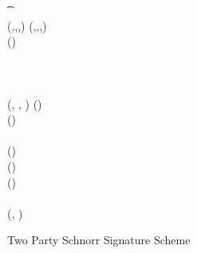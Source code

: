 \begin{figure}
\begin{center}
{\begin{varwidth}{\textwidth}
{            \t \pcreturn \cnstFalsum \< \< \\
            \pcreturn (\varSecKeyAlice,\varPubKeyAlice,\varNonceAlice,\varSigContext) \< \< \pcreturn (\varSecKeyBob,\varPubKeyBob,\varNonceBob,\varSigContext)
            } \\
            \procedure[linenumbering]{$\procSignPrt{\varMsg}{\varSecKeyAlice}{\varNonceAlice}{\varSigContext}$} {
            (\varRand \opSeperate \varPubKey) \opFunResult \varSigContext \\
            \varRandAlice \opAssign \funGen{\varNonceAlice} \\
            \varSchnorrChallenge \opAssign \funHash{\varMsg \opConc \varRand \opConc \varPubKey} \\
            \varSAlice \opAssign \varNonceAlice \opAddScalar \varSecKeyAlice \opTimesScalar \varSchnorrChallenge \\
            \pcreturn \varSigAlice \opAssign (\varSAlice, \varRandAlice, \varSigContext)
            }
            \procedure[linenumbering]{$\procVerfPtSig{\varSigAlice}{\varMsg}{\varPubKeyAlice}$} {
            (\varSAlice \opSeperate \varRandAlice \opSeperate \varSigContext) \opFunResult \varSigAlice \\
            (\varPubKey \opSeperate \varRand) \opFunResult \varSigContext \\
            \varSchnorrChallenge \opAssign \funHash{\varMsg \opConc \varRand \opConc \varPubKey} \\
            \pcreturn \funGen{\varSAlice} \opEq \varRandAlice \opAddPoint \opPointScalar{\varPubKeyAlice}{\varSchnorrChallenge}
            }
            \procedure[linenumbering]{$\procFinSig{\varSigAlice}{\varSigBob}$} {
            (\varSAlice \opSeperate \varRandAlice \opSeperate \varSigContext) \opFunResult \varSigAlice \\
            (\varSBob \opSeperate \varRandBob \opSeperate \varSigContext) \opFunResult \varSigBob \\
            (\varPubKey \opSeperate \varRand) \opFunResult \varSigContext \\
            \varS \opAssign \varSAlice \opAddScalar \varSBob \\
            \varSigFin \opAssign (\varS, \varRand) \\
            \pcreturn \varSigFin
            }
        \end{varwidth}
        }
    \end{center}
    \caption{Two Party Schnorr Signature Scheme}
    \label{fig:twoparty-schnorr}
\end{figure}

